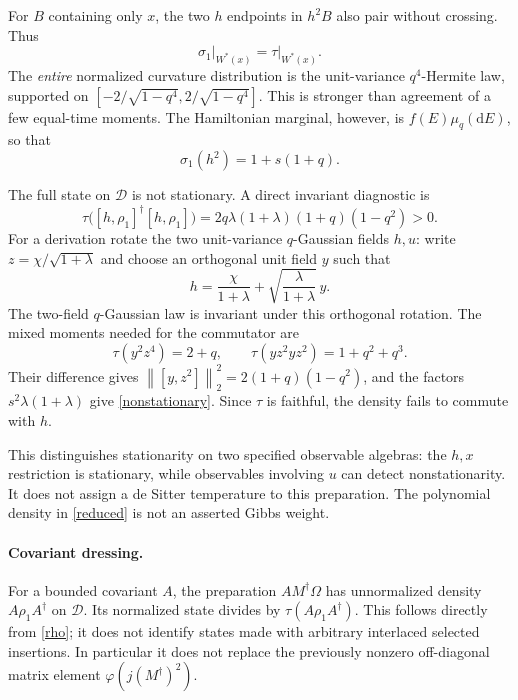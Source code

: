 \documentclass[11pt]{article}
\newcommand{\dd}{\mathrm d}
\newcommand{\norm}[1]{\left\lVert#1\right\rVert}
\newcommand{\D}{\mathcal D}
\begin{document}
For $B$ containing only $x$, the two $h$ endpoints in $h^2B$ also pair
without crossing. Thus
\begin{equation}\label{marginal}
 \sigma_1\big|_{W^*(x)}=\tau\big|_{W^*(x)}.
\end{equation}
The \emph{entire} normalized curvature distribution is the unit-variance
$q^4$-Hermite law, supported on
$[-2/\sqrt{1-q^4},2/\sqrt{1-q^4}]$. This is stronger than agreement of
a few equal-time moments. The Hamiltonian marginal, however, is
$f(E)\mu_q(\dd E)$, so that
\begin{equation}
 \sigma_1(h^2)=1+s(1+q).
\end{equation}

The full state on $\D$ is not stationary. A direct invariant diagnostic is
\begin{equation}\boxed{
 \tau\bigl([h,\rho_1]^\dagger[h,\rho_1]\bigr)
 =2q\lambda(1+\lambda)(1+q)(1-q^2)>0.}\label{nonstationary}
\end{equation}
For a derivation rotate the two unit-variance $q$-Gaussian fields $h,u$:
write $z=\chi/\sqrt{1+\lambda}$ and choose an orthogonal unit field $y$
such that
\begin{equation}
 h=\frac{\chi}{1+\lambda}
       +\sqrt{\frac{\lambda}{1+\lambda}}\,y .
\end{equation}
The two-field $q$-Gaussian law is invariant under this orthogonal
rotation. The mixed moments needed for the commutator are
\begin{equation}
 \tau(y^2z^4)=2+q,\qquad
 \tau(yz^2yz^2)=1+q^2+q^3.
\end{equation}
Their difference gives
$\norm{[y,z^2]}_2^2=2(1+q)(1-q^2)$, and the factors
$s^2\lambda(1+\lambda)$ give \eqref{nonstationary}. Since $\tau$ is
faithful, the density fails to commute with $h$.

This distinguishes stationarity on two specified observable algebras:
the $h,x$ restriction is stationary, while observables involving $u$
can detect nonstationarity. It does not assign a de Sitter temperature
to this preparation. The polynomial density in \eqref{reduced} is
not an asserted Gibbs weight.

\paragraph{Covariant dressing.}
For a bounded covariant $A$, the preparation $A M^\dagger\Omega$ has
unnormalized density $A\rho_1 A^\dagger$ on $\D$. Its normalized state
divides by $\tau(A\rho_1 A^\dagger)$. This follows directly from
\eqref{rho}; it does not identify states made with arbitrary interlaced
selected insertions. In particular it does not replace the previously
nonzero off-diagonal matrix element $\varphi(j(M^\dagger)^2)$.
\end{document}
